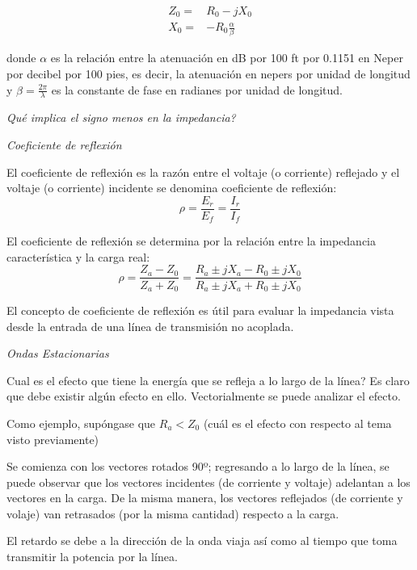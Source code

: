 \documentclass[12pt,letterpaper,titlepage,twoside]{book}
\begin{document}
\begin{align}
Z_0 =& R_0 - j X_0\\
X_0 =& -R_0\frac{\alpha}{\beta}
\end{align}

donde $\alpha$ es la relación entre la atenuación en dB por 100 ft por 0.1151 en Neper por decibel por 100 pies, es decir, la atenuación en nepers por unidad de longitud y $\beta = \frac{2\pi}{\lambda}$ es la constante de fase en radianes por unidad de longitud.

\emph{Qué implica el signo menos en la impedancia?}

\emph{Coeficiente de reflexión }

El coeficiente de reflexión es la razón entre el voltaje (o corriente) reflejado y el voltaje (o corriente) incidente se denomina coeficiente de reflexión:
\begin{equation}
\rho = \frac{E_r}{E_f} = \frac{I_r}{I_f}
\end{equation}

El coeficiente de reflexión se determina por la relación entre la impedancia característica y la carga real:
\begin{equation}
\rho = \frac{Z_a - Z_0}{Z_a +Z_0} = \frac{R_a \pm jX_a -  R_0 \pm jX_0}{R_a \pm jX_a +  R_0 \pm jX_0}
\end{equation}

El concepto de coeficiente de reflexión es útil para evaluar la impedancia vista desde la entrada de una línea de transmisión no acoplada.

\emph{Ondas Estacionarias}

Cual es el efecto que tiene la energía que se refleja a lo largo de la línea? Es claro que debe existir algún efecto en ello. Vectorialmente se puede analizar el efecto. 

Como ejemplo, supóngase que $R_a < Z_0$ (cuál es el efecto con respecto al tema visto previamente)

Se comienza con los vectores rotados 90º; regresando a lo largo de la línea, se puede observar que los vectores incidentes (de corriente y voltaje) adelantan a los vectores en la carga.
De la misma manera, los vectores reflejados (de corriente y volaje) van retrasados (por la misma cantidad) respecto a la carga.

El retardo se debe a la dirección de la onda viaja así como al tiempo que toma transmitir la potencia por la línea. 
\end{document}
